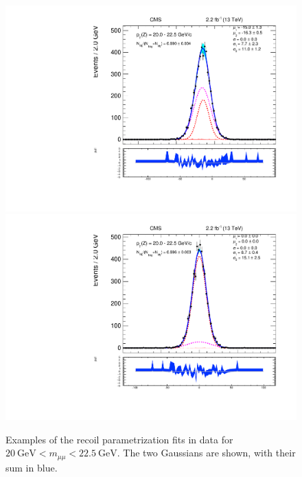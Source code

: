 \begin{figure}
\centering
\includegraphics[width=0.49\linewidth]{plots/Recoil/example-data-pfu1fit_12.pdf}
\includegraphics[width=0.49\linewidth]{plots/Recoil/example-data-pfu2fit_12.pdf}
\caption{Examples of the recoil parametrization fits in data for $20~\mathrm{GeV} < m_{\mu\mu}  < 22.5~\mathrm{GeV}$. The two Gaussians are shown, with their sum in blue.}
\label{fig:recoil:data_fit_example}
\end{figure}